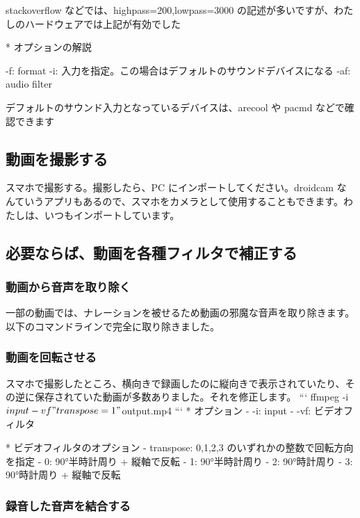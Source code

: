\documentclass[mingoth,a4paper]{jsarticle}
\begin{document}
stackoverflow などでは、highpass=200,lowpass=3000 の記述が多いですが、わたしのハードウェアでは上記が有効でした

* オプションの解説
\begin{commandline}
  -f: format
  -i: 入力を指定。この場合はデフォルトのサウンドデバイスになる
  -af: audio filter
\end{commandline}

デフォルトのサウンド入力となっているデバイスは、arecool や pacmd などで確認できます

\subsection{動画を撮影する}
スマホで撮影する。撮影したら、PC にインポートしてください。droidcam なんていうアプリもあるので、スマホをカメラとして使用することもできます。わたしは、いつもインポートしています。

\subsection{必要ならば、動画を各種フィルタで補正する}

\subsubsection{動画から音声を取り除く}
一部の動画では、ナレーションを被せるため動画の邪魔な音声を取り除きます。以下のコマンドラインで完全に取り除きました。
%
%
\subsubsection{ 動画を回転させる}
スマホで撮影したところ、横向きで録画したのに縦向きで表示されていたり、その逆に保存されていた動画が多数ありました。それを修正します。
```
ffmpeg -i ${input} -vf "transpose=1" ${output}.mp4
```
* オプション
  - -i: input
  - -vf: ビデオフィルタ

* ビデオフィルタのオプション
  - transpose: 0,1,2,3 のいずれかの整数で回転方向を指定
	  - 0: 90°半時計周り + 縦軸で反転
	  - 1: 90°半時計周り
	  - 2: 90°時計周り
	  - 3: 90°時計周り + 縦軸で反転

\subsubsection{録音した音声を結合する}
%
%
%
%
%
\end{document}
